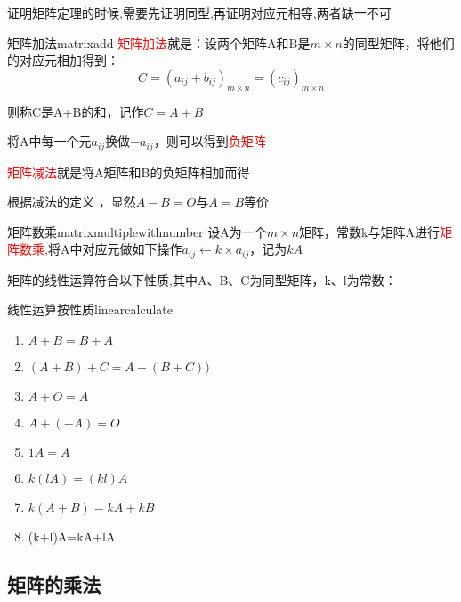 \begin{note}
	证明矩阵定理的时候,需要先证明同型,再证明对应元相等,两者缺一不可
\end{note}

\begin{definition}{矩阵加法}{matrixadd}
\textcolor{red}{矩阵加法}就是：设两个矩阵A和B是$m\times n$的同型矩阵，将他们的对应元相加得到：
\begin{equation*}
C=(a_{ij}+b_{ij})_{m\times n}=(c_{ij})_{m\times n}
\end{equation*}

则称C是A+B的和，记作$C=A+B$

\end{definition}

将A中每一个元$a_{ij}$换做$-a_{ij}$，则可以得到\textcolor{red}{负矩阵}

\textcolor{red}{矩阵减法}就是将A矩阵和B的负矩阵相加而得

根据减法的定义 ，显然$A-B=O$与$A=B$等价

\begin{definition}{矩阵数乘}{matrixmultiplewithnumber}
	设A为一个$m\times n$矩阵，常数k与矩阵A进行\textcolor{red}{矩阵数乘},将A中对应元做如下操作$a_{ij}\leftarrow k\times a_{ij}$，记为$kA$
\end{definition}

矩阵的线性运算符合以下性质,其中A、B、C为同型矩阵，k、l为常数：
\begin{theorem}{线性运算按性质}{linearcalculate}
	\begin{enumerate}
		\item {$A+B=B+A$}
		\item {$(A+B)+C=A+(B+C))$}
		\item {$A+O=A$}
		\item {$A+(-A)=O$}
		\item {$1A=A$}
		\item {$k(lA)=(kl)A$}
		\item {$k(A+B)=kA+kB$}
		\item {(k+l)A=kA+lA}
	\end{enumerate}
\end{theorem}


\subsection{矩阵的乘法}


